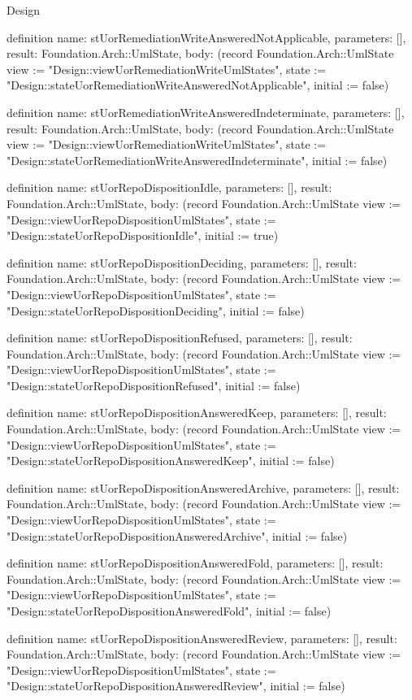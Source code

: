 \begin{lexlean}{Design}
\begin{semanticmodule}
definition{
  name: stUorRemediationWriteAnsweredNotApplicable,
  parameters: [],
  result: Foundation.Arch::UmlState,
  body: (record Foundation.Arch::UmlState {view := "Design::viewUorRemediationWriteUmlStates", state := "Design::stateUorRemediationWriteAnsweredNotApplicable", initial := false})
}

definition{
  name: stUorRemediationWriteAnsweredIndeterminate,
  parameters: [],
  result: Foundation.Arch::UmlState,
  body: (record Foundation.Arch::UmlState {view := "Design::viewUorRemediationWriteUmlStates", state := "Design::stateUorRemediationWriteAnsweredIndeterminate", initial := false})
}

definition{
  name: stUorRepoDispositionIdle,
  parameters: [],
  result: Foundation.Arch::UmlState,
  body: (record Foundation.Arch::UmlState {view := "Design::viewUorRepoDispositionUmlStates", state := "Design::stateUorRepoDispositionIdle", initial := true})
}

definition{
  name: stUorRepoDispositionDeciding,
  parameters: [],
  result: Foundation.Arch::UmlState,
  body: (record Foundation.Arch::UmlState {view := "Design::viewUorRepoDispositionUmlStates", state := "Design::stateUorRepoDispositionDeciding", initial := false})
}

definition{
  name: stUorRepoDispositionRefused,
  parameters: [],
  result: Foundation.Arch::UmlState,
  body: (record Foundation.Arch::UmlState {view := "Design::viewUorRepoDispositionUmlStates", state := "Design::stateUorRepoDispositionRefused", initial := false})
}

definition{
  name: stUorRepoDispositionAnsweredKeep,
  parameters: [],
  result: Foundation.Arch::UmlState,
  body: (record Foundation.Arch::UmlState {view := "Design::viewUorRepoDispositionUmlStates", state := "Design::stateUorRepoDispositionAnsweredKeep", initial := false})
}

definition{
  name: stUorRepoDispositionAnsweredArchive,
  parameters: [],
  result: Foundation.Arch::UmlState,
  body: (record Foundation.Arch::UmlState {view := "Design::viewUorRepoDispositionUmlStates", state := "Design::stateUorRepoDispositionAnsweredArchive", initial := false})
}

definition{
  name: stUorRepoDispositionAnsweredFold,
  parameters: [],
  result: Foundation.Arch::UmlState,
  body: (record Foundation.Arch::UmlState {view := "Design::viewUorRepoDispositionUmlStates", state := "Design::stateUorRepoDispositionAnsweredFold", initial := false})
}

definition{
  name: stUorRepoDispositionAnsweredReview,
  parameters: [],
  result: Foundation.Arch::UmlState,
  body: (record Foundation.Arch::UmlState {view := "Design::viewUorRepoDispositionUmlStates", state := "Design::stateUorRepoDispositionAnsweredReview", initial := false})
}


\end{semanticmodule}
\end{lexlean}

